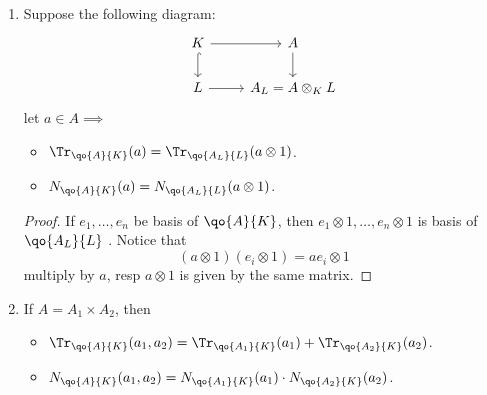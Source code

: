 \begin{proposition}
\begin{enumerate}
\begin{proof}
\[\begin{aligned}
					      \gamma_{jiqp} e_j f_p \implies \Tr_{\qo{A}{k}}(a) = \sum_{\substack{j = 1 \sim n                       \\
					      q = 1 \sim m}} \gamma_{jiqp}                                                                           \\
					      \Tr_{\qo{A}{K}}(a)                            & = \sum_{j=1}^n \alpha_{jj}                             \\
					      \implies \Tr_{\qo{K}{k}}(\Tr_{\qo{A}{K}} (a)) & = \sum_{j=1}^n
					      \Tr_{\qo{K}{k}}(\alpha_{jj})                                                                           \\
					                                                    & = \sum_{j=1}^n \sum_{q=1}^m \gamma_{jjqq}
				      \end{aligned}
			      \]
			      which completes the proof.
		      \end{proof}
		\item Suppose the following diagram:
		      \[
			      \begin{tikzcd}
				      K \arrow[r] \arrow[d, hook] & A \arrow[d] \\
				      L \arrow[r] & A_L = A \otimes_K L
			      \end{tikzcd}
		      \]
		      let \( a\in A \implies \)
		      \begin{itemize}
			      \item \( \Tr_{\qo{A}{K}}(a) = \Tr_{\qo{A_L}{L}}(a\otimes 1) \).
			      \item \( N_{\qo{A}{K}}(a) = N_{\qo{A_L}{L}}(a\otimes 1) \).
		      \end{itemize}

		      \begin{proof}
			      If \( e_1,\ldots, e_n \) be basis of \( \qo{A}{K} \), then \( e_1\otimes 1,\ldots, e_n
			      \otimes 1 \) is basis of \( \qo{A_L}{L} \) . Notice that
			      \[
				      (a\otimes 1)(e_i \otimes 1) = ae_i \otimes 1
			      \]
			      multiply by \( a \), resp \( a\otimes 1 \) is given by the same matrix.
		      \end{proof}
		\item If \( A = A_1 \times A_2 \), then
		      \begin{itemize}
			      \item \( \Tr_{\qo{A}{K}}(a_1,a_2) = \Tr_{\qo{A_1}{K}}(a_1) + \Tr_{\qo{A_2}{K}}(a_2) \).
			      \item \( N_{\qo{A}{K}}(a_1,a_2) = N_{\qo{A_1}{K}}(a_1) \cdot N_{\qo{A_2}{K}}(a_2) \).
		      \end{itemize}


\end{enumerate}
\end{proposition}
